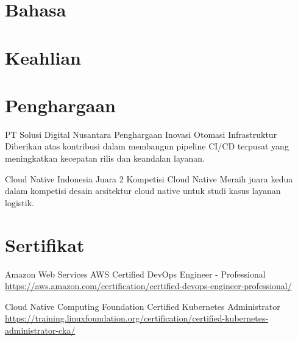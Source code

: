 \documentclass[a4paper, serif, 10pt]{moderncv}
\begin{document}
\section{Bahasa}

\section{Keahlian}

\section{Penghargaan}

        {PT Solusi Digital Nusantara}
        {Penghargaan Inovasi Otomasi Infrastruktur}
        {}
        {}
        {Diberikan atas kontribusi dalam membangun pipeline CI/CD terpusat yang meningkatkan kecepatan rilis dan keandalan layanan.}

        {Cloud Native Indonesia}
        {Juara 2 Kompetisi Cloud Native}
        {}
        {}
        {Meraih juara kedua dalam kompetisi desain arsitektur cloud native untuk studi kasus layanan logistik.}
\section{Sertifikat}

        {Amazon Web Services}
        {AWS Certified DevOps Engineer - Professional}
        {\url{https://aws.amazon.com/certification/certified-devops-engineer-professional/}}
        {}
        {}

        {Cloud Native Computing Foundation}
        {Certified Kubernetes Administrator}
        {\url{https://training.linuxfoundation.org/certification/certified-kubernetes-administrator-cka/}}
        {}
        {}
\end{document}
